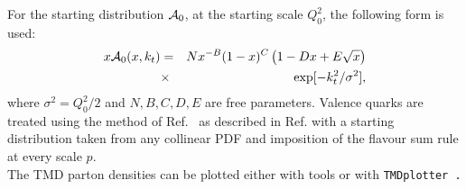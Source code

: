 For the starting distribution ${\cal A}_0$, at the starting scale $Q_0^2$, 
the following form is used:
\begin{eqnarray}
x{\cal A}_0(x,\kt) &=& N x^{-B}(1 -x)^{C}\left(1 -D x 
+ E \sqrt{x}   \right) \nonumber\\
   &\times &\exp[ - k_t^2 / \sigma^2 ], 
\label{a0-5par}
\end{eqnarray}
where $ \sigma^2  =  Q_0^2 / 2 $ and $N, B, C, D, E$ are free parameters.
Valence quarks are treated using the method of Ref.~\cite{Deak:2010gk} as described 
in Ref. \cite{Hautmann:2013tba} with a starting distribution taken from any collinear PDF
and imposition of the flavour sum rule at every scale $p$.
\\
The TMD parton densities can be plotted either with \fitter tools 
or with \tt TMDplotter\rm~\cite{Hautmann:2014kza}.


